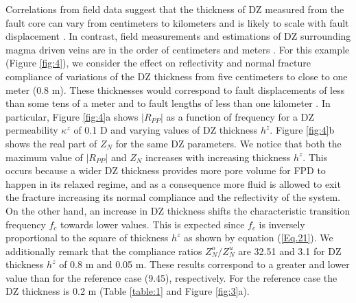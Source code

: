 \documentclass[draft]{agujournal2019}
\begin{document}
Correlations from field data suggest that the thickness of  DZ  measured from the fault core can vary from centimeters to kilometers and is likely to scale with fault displacement  \cite{Mitchell2009, Faulkner2011}. In contrast, field measurements and estimations of DZ surrounding magma driven veins are in the order of centimeters and meters \cite{Engvik2005}. 
For this example (Figure \ref{fig:4}), we consider the effect on reflectivity and normal fracture compliance of variations of the DZ thickness  from five centimeters to close to one meter (0.8 m). These thicknesses would  correspond to fault displacements of less than some tens of a meter  \cite{Mitchell2009, Faulkner2011} and to fault lengths of less than one kilometer \cite{Cowie1992}.
In particular,
Figure \ref{fig:4}a shows $|R_{PP}|$ as a function of frequency for a DZ permeability $ \kappa^z $ of 0.1 D and varying values of DZ thickness $h^z$. Figure \ref{fig:4}b shows the real part of $Z_N$ for the same DZ parameters. We notice that both the maximum value of $|R_{PP}|$ and $Z_N$ increases with increasing thickness $h^z$. This occurs because a wider DZ thickness provides more pore volume for FPD to happen in its relaxed regime, and as a consequence more fluid is allowed to exit the fracture increasing its normal compliance and the reflectivity of the system.
On the other hand, an increase in DZ thickness shifts the characteristic transition frequency $f_c$ towards lower values. This is expected since $f_c$ is inversely proportional to the square of thickness $h^z$ as shown by equation (\ref{Eq.21}).  We additionally remark that the compliance ratios $Z_N^o/Z_N^u$ are 32.51 and 3.1 for DZ thickness $h^z$ of 0.8 m and 0.05 m. These results correspond to a greater and lower value than for the reference case (9.45), respectively. For the reference case the DZ thickness is 0.2 m (Table \ref{table:1} and Figure \ref{fig:3}a).
\end{document}
